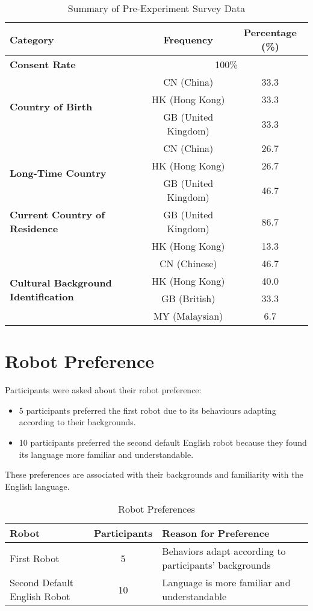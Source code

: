 \begin{table}[htbp]
\centering
\label{tab:pre_experiment_survey}
\begin{tabular}{|l|c|c|}
\hline
\textbf{Category} & \textbf{Frequency} & \textbf{Percentage (\%)} \\ \hline
\textbf{Consent Rate} & \multicolumn{2}{c|}{100\%} \\ \hline
\multirow{3}{*}{\textbf{Country of Birth}} & CN (China) & 33.3 \\
 & HK (Hong Kong) & 33.3 \\
 & GB (United Kingdom) & 33.3 \\ \hline
\multirow{3}{*}{\textbf{Long-Time Country}} & CN (China) & 26.7 \\
 & HK (Hong Kong) & 26.7 \\
 & GB (United Kingdom) & 46.7 \\ \hline
\textbf{Current Country of Residence} & GB (United Kingdom) & 86.7 \\
 & HK (Hong Kong) & 13.3 \\ \hline
\multirow{4}{*}{\textbf{Cultural Background Identification}} & CN (Chinese) & 46.7 \\
 & HK (Hong Kong) & 40.0 \\
 & GB (British) & 33.3 \\
 & MY (Malaysian) & 6.7 \\ \hline
\end{tabular}
\caption{Summary of Pre-Experiment Survey Data}
\end{table}

\section{Robot Preference}

Participants were asked about their robot preference:
\begin{itemize}
\item 5 participants preferred the first robot due to its behaviours adapting according to their backgrounds.
\item 10 participants preferred the second default English robot because they found its language more familiar and understandable.
\end{itemize}
These preferences are associated with their backgrounds and familiarity with the English language.

\begin{table}[htbp]
\centering
\label{tab:robot_preferences}
\begin{tabular}{|l|c|p{6cm}|}
\hline
\textbf{Robot} & \textbf{Participants} & \textbf{Reason for Preference} \\ \hline
First Robot & 5 & Behaviors adapt according to participants' backgrounds \\ \hline
Second Default English Robot & 10 & Language is more familiar and understandable \\ \hline
\end{tabular}
\caption{Robot Preferences}
\end{table}

